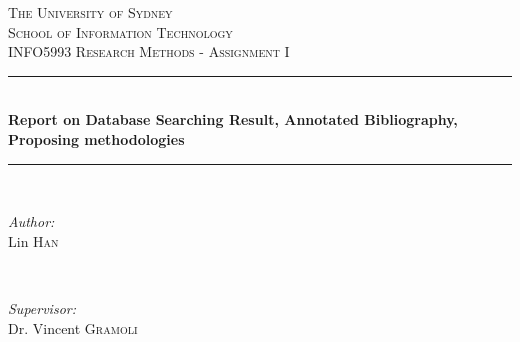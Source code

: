 \begin{titlepage}

\newcommand{\HRule}{\rule{\linewidth}{0.5mm}} %

\center %
 

\textsc{\LARGE The University of Sydney}\\[1.5cm] %
\textsc{\Large School of Information Technology}\\[0.5cm] %
\textsc{\large INFO5993 Research Methods - Assignment I}\\[0.5cm] %


\HRule \\[0.4cm]
{ \huge \bfseries Report on Database Searching Result, Annotated Bibliography, Proposing methodologies}\\[0.4cm] %
\HRule \\[1.5cm]
 

\begin{minipage}{0.4\textwidth}
\begin{flushleft} \large
\emph{Author:}\\
Lin \textsc{Han} %
\end{flushleft}
\end{minipage}
~
\begin{minipage}{0.4\textwidth}
\begin{flushright} \large
\emph{Supervisor:} \\
Dr. Vincent \textsc{Gramoli} %
\end{flushright}
\end{minipage}\\[2cm]


\end{titlepage}
